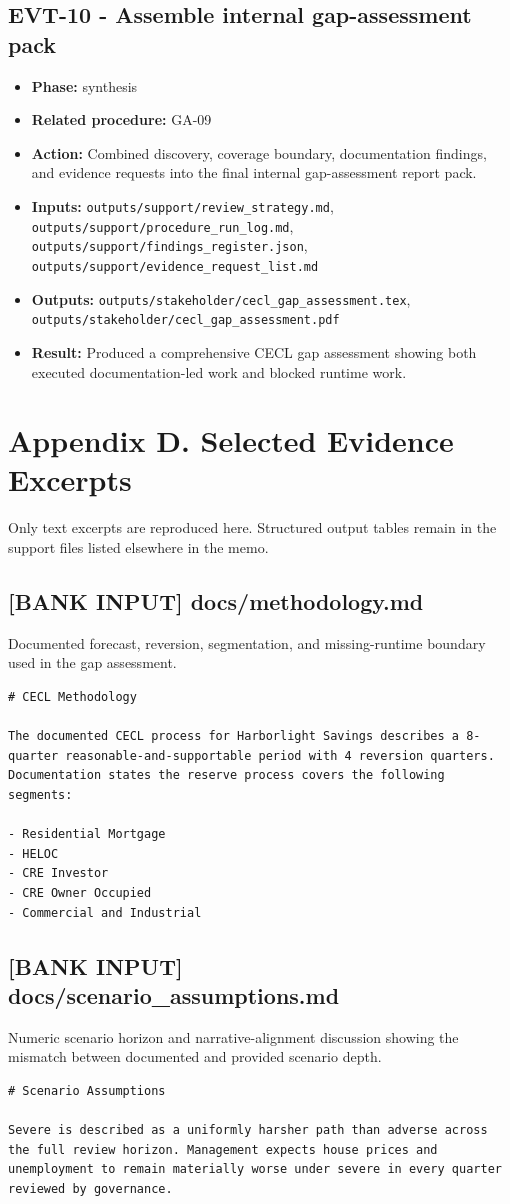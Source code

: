 \documentclass[11pt]{article}
\begin{document}
\subsection*{EVT-10 - Assemble internal gap-assessment pack}
\begin{itemize}
\item \textbf{Phase:} synthesis
\item \textbf{Related procedure:} GA-09
\item \textbf{Action:} Combined discovery, coverage boundary, documentation findings, and evidence requests into the final internal gap-assessment report pack.
\item \textbf{Inputs:} \texttt{outputs/support/review\_strategy.md}, \texttt{outputs/support/procedure\_run\_log.md}, \texttt{outputs/support/findings\_register.json}, \texttt{outputs/support/evidence\_request\_list.md}
\item \textbf{Outputs:} \texttt{outputs/stakeholder/cecl\_gap\_assessment.tex}, \texttt{outputs/stakeholder/cecl\_gap\_assessment.pdf}
\item \textbf{Result:} Produced a comprehensive CECL gap assessment showing both executed documentation-led work and blocked runtime work.
\end{itemize}
\section*{Appendix D. Selected Evidence Excerpts}
Only text excerpts are reproduced here. Structured output tables remain in the support files listed elsewhere in the memo.
\subsection*{[BANK INPUT] docs/methodology.md}
Documented forecast, reversion, segmentation, and missing-runtime boundary used in the gap assessment.
\begin{Verbatim}[fontsize=\small]
# CECL Methodology

The documented CECL process for Harborlight Savings describes a 8-quarter reasonable-and-supportable period with 4 reversion quarters. Documentation states the reserve process covers the following segments:

- Residential Mortgage
- HELOC
- CRE Investor
- CRE Owner Occupied
- Commercial and Industrial
\end{Verbatim}
\subsection*{[BANK INPUT] docs/scenario\_assumptions.md}
Numeric scenario horizon and narrative-alignment discussion showing the mismatch between documented and provided scenario depth.
\begin{Verbatim}[fontsize=\small]
# Scenario Assumptions

Severe is described as a uniformly harsher path than adverse across the full review horizon. Management expects house prices and unemployment to remain materially worse under severe in every quarter reviewed by governance.
\end{Verbatim}
\end{document}
